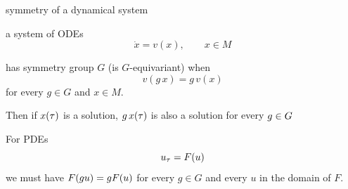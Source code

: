 

\begin{frame}{symmetry of a dynamical system}






\begin{block}{a system of ODEs}
 \[
  \dot{x}=v(x), \qquad x\in M
 \]
\end{block}

\begin{block}{has symmetry group $G$ (is $G$-equivariant) when}
 \[
  v(g\,x)=g\,v(x)
 \]
 for every $g\in G$ and  $x\in M$.
\end{block}


\begin{block}{}
  Then if $x(\tau)$ is a solution, $g\,x(\tau)$ is also a solution for every $g \in G$
\end{block}

\begin{block}{For PDEs}
 \[
  u_\tau=F(u)
 \]
 we must have $F(g u) = g F(u)$ for every $g\in G$ and every $u$ in the domain of $F$.

\end{block}


\end{frame}

